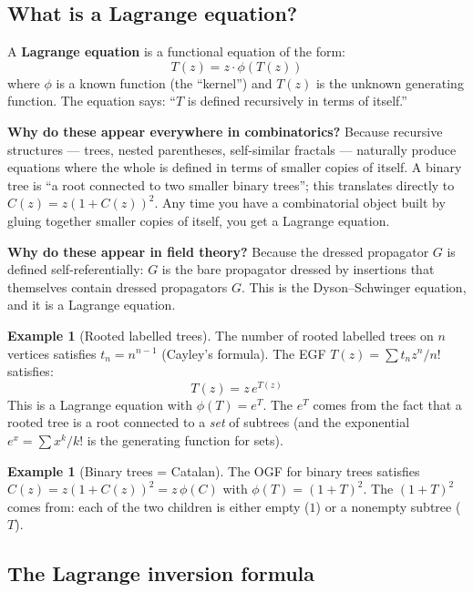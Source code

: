 \documentclass[11pt,a4paper]{article}
\theoremstyle{definition}
\newtheorem{example}[theorem]{Example}
\begin{document}
\subsection{What is a Lagrange equation?}

A \textbf{Lagrange equation} is a functional equation of the form:
\begin{equation}
T(z) = z \cdot \phi(T(z))
\label{eq:lagrange_general}
\end{equation}
where $\phi$ is a known function (the ``kernel'') and $T(z)$ is the
unknown generating function. The equation says: ``$T$ is defined
recursively in terms of itself.''

\textbf{Why do these appear everywhere in combinatorics?} Because
recursive structures --- trees, nested parentheses, self-similar
fractals --- naturally produce equations where the whole is defined
in terms of smaller copies of itself. A binary tree is ``a root connected
to two smaller binary trees''; this translates directly to
$C(z) = z(1 + C(z))^2$. Any time you have a combinatorial object built
by gluing together smaller copies of itself, you get a Lagrange equation.

\textbf{Why do these appear in field theory?} Because the dressed
propagator $G$ is defined self-referentially: $G$ is the bare propagator
dressed by insertions that themselves contain dressed propagators $G$.
This is the Dyson--Schwinger equation, and it is a Lagrange equation.

\begin{example}[Rooted labelled trees]
The number of rooted labelled trees on $n$ vertices satisfies $t_n = n^{n-1}$
(Cayley's formula). The EGF $T(z) = \sum t_n z^n/n!$ satisfies:
\[
T(z) = z\, e^{T(z)}
\]
This is a Lagrange equation with $\phi(T) = e^T$. The $e^T$ comes from
the fact that a rooted tree is a root connected to a \emph{set} of
subtrees (and the exponential $e^x = \sum x^k/k!$ is the generating
function for sets).
\end{example}

\begin{example}[Binary trees = Catalan]
The OGF for binary trees satisfies $C(z) = z(1 + C(z))^2 = z\,\phi(C)$
with $\phi(T) = (1+T)^2$. The $(1+T)^2$ comes from: each of the two
children is either empty ($1$) or a nonempty subtree ($T$).
\end{example}

\subsection{The Lagrange inversion formula}
\end{document}
